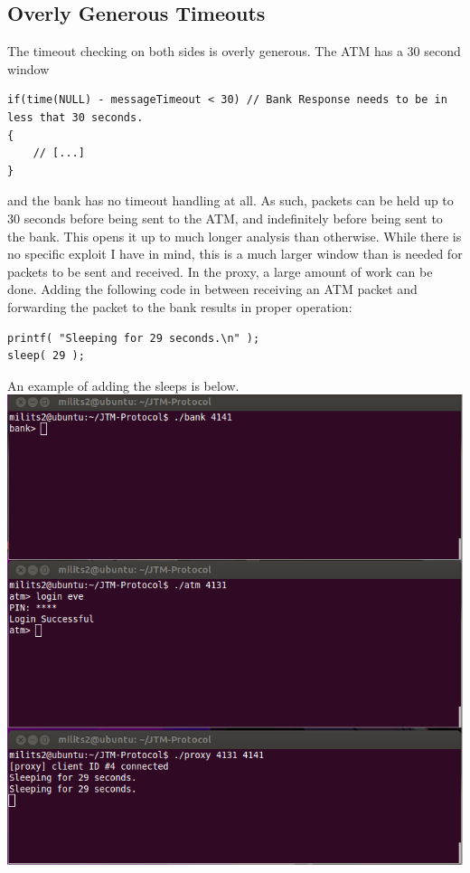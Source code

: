 \documentclass{article}
\begin{document}
\subsection{Overly Generous Timeouts}
The timeout checking on both sides is overly generous. The ATM has a 30 second window
\begin{lstlisting}
if(time(NULL) - messageTimeout < 30) // Bank Response needs to be in less that 30 seconds.
{
    // [...]
}
\end{lstlisting}
and the bank has no timeout handling at all. As such, packets can be held up to 30 seconds before being sent to the ATM, and indefinitely before being sent to the bank. This opens it up to much longer analysis than otherwise. While there is no specific exploit I have in mind, this is a much larger window than is needed for packets to be sent and received. In the proxy, a large amount of work can be done. Adding the following code in between receiving an ATM packet and forwarding the packet to the bank results in proper operation:
\begin{lstlisting}
printf( "Sleeping for 29 seconds.\n" );
sleep( 29 );
\end{lstlisting}
An example of adding the sleeps is below.
\\
\includegraphics[scale=0.85]{slowLogin.png}
\\
\end{document}
